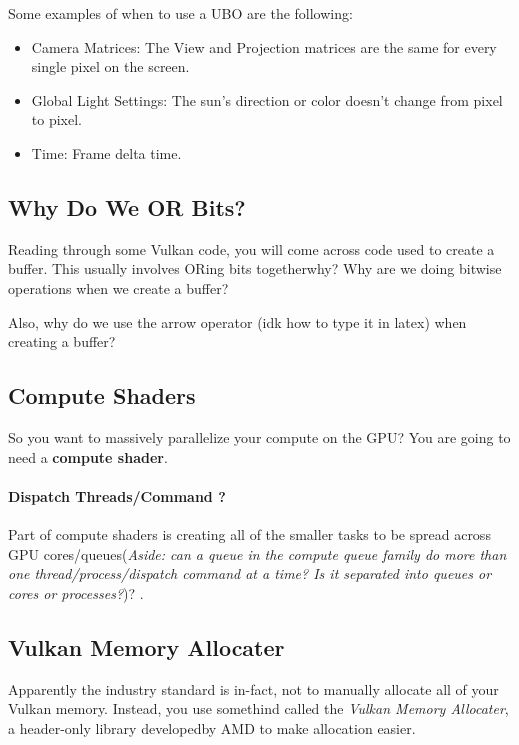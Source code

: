 \documentclass{article}
\begin{document}
\par Some examples of when to use a UBO are the following:

\begin{itemize}
  \item Camera Matrices: The View and Projection matrices are the
    same for every single pixel on the screen.
  \item Global Light Settings: The sun's direction or color doesn't
    change from pixel to pixel.
  \item Time: Frame delta time.
\end{itemize}

\subsection*{Why Do We OR Bits?}
\par Reading through some Vulkan code, you will come across code used
to create a buffer. This usually involves ORing bits
together\textemdash why? Why are we doing bitwise operations when we
create a buffer?

\par Also, why do we use the arrow operator (idk how to type it in
latex) when creating a buffer?

\subsection*{Compute Shaders}
\par So you want to massively parallelize your compute on the GPU?
You are going to need a \textbf{compute shader}.

\paragraph*{Dispatch Threads/Command ?}
Part of compute shaders is creating all of the smaller tasks to be
spread across GPU cores/queues(\textit{Aside: can a queue in the
    compute queue family do more than one thread/process/dispatch command
at a time? Is it separated into queues or cores or processes?})? .

\subsection*{Vulkan Memory
Allocater}
\par Apparently the industry standard is in-fact, not to manually
allocate all of your Vulkan memory. Instead, you use somethind called
the \textit{Vulkan Memory Allocater}, a header-only library
developedby AMD to make allocation easier.
\end{document}
